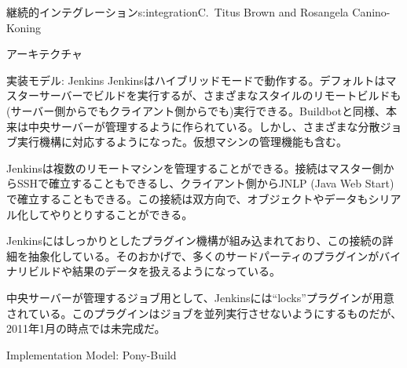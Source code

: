 \begin{aosachapter}{継続的インテグレーション}{s:integration}{C.\ Titus Brown and Rosangela Canino-Koning}
\begin{aosasect1}{アーキテクチャ}
\begin{aosasect2}{実装モデル: Jenkins}
Jenkinsはハイブリッドモードで動作する。デフォルトはマスターサーバーでビルドを実行するが、さまざまなスタイルのリモートビルドも(サーバー側からでもクライアント側からでも)実行できる。Buildbotと同様、本来は中央サーバーが管理するように作られている。しかし、さまざまな分散ジョブ実行機構に対応するようになった。仮想マシンの管理機能も含む。

Jenkinsは複数のリモートマシンを管理することができる。接続はマスター側からSSHで確立することもできるし、クライアント側からJNLP (Java Web Start)で確立することもできる。この接続は双方向で、オブジェクトやデータもシリアル化してやりとりすることができる。

Jenkinsにはしっかりとしたプラグイン機構が組み込まれており、この接続の詳細を抽象化している。そのおかげで、多くのサードパーティのプラグインがバイナリビルドや結果のデータを扱えるようになっている。

中央サーバーが管理するジョブ用として、Jenkinsには``locks''プラグインが用意されている。このプラグインはジョブを並列実行させないようにするものだが、2011年1月の時点では未完成だ。

\end{aosasect2}

\begin{aosasect2}{Implementation Model: Pony-Build}



\end{aosasect2}
\end{aosasect1}
\end{aosachapter}
